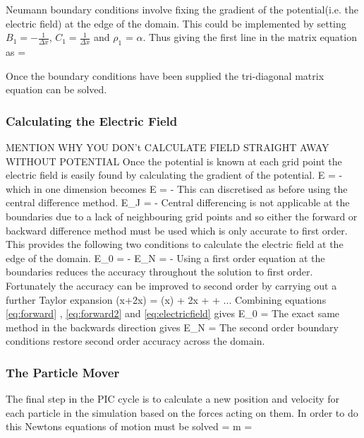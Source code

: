 Neumann boundary conditions involve fixing the gradient of the potential(i.e. the electric field) at the edge of the domain. This could be implemented by setting $B_1  = -\frac{1}{\Delta x}$, $C_1 = \frac{1}{\Delta x}$ and $\rho_1$ = $\alpha$. Thus giving the first line in the matrix equation as 
\be 
{} = \alpha 
\ee 

Once the boundary conditions have been supplied the tri-diagonal matrix equation can be solved.
 
\subsubsection{Calculating the Electric Field}
MENTION WHY YOU DON't CALCULATE FIELD STRAIGHT AWAY WITHOUT POTENTIAL
Once the potential is known at each grid point the electric field is easily found by calculating the gradient of the potential.
\be 
E = - \nabla \psi
\ee 
which in one dimension becomes
\be 
E = - 
\label{eq:electricfield}
\ee
This can discretised as before using the central difference method. 
\be 
E_J = - 
\ee 
Central differencing is not applicable at the boundaries due to a lack of neighbouring grid points and so either the forward or backward difference method must be used which is only accurate to first order. This provides the following two conditions to calculate the electric field at the edge of the domain.
\be
E_0 = - 
\ee 
\be 
E_N = - 
\ee
Using a first order equation at the boundaries reduces the accuracy throughout the solution to first order. Fortunately the accuracy can be improved to second order by carrying out a further Taylor expansion 
\be
\psi(x+2\Delta x) = \psi(x) + 2\Delta x  +  + ...
\label{eq:forward2}
\ee
Combining equations \eqref{eq:forward} , \eqref{eq:forward2} and \eqref{eq:electricfield} gives 
\be 
E_0 = 
\ee 
The exact same method in the backwards direction gives 
\be 
E_N = 
\ee
The second order boundary conditions restore second order accuracy across the domain.
\subsubsection{The Particle Mover}
The final step in the PIC cycle is to calculate a new position and velocity for each particle in the simulation based on the forces acting on them. In order to do this Newtons equations of motion must be solved 
\be 
{}  = m 
\ee 
\be 
{} = 
\label{eq:diff2}
\ee 

